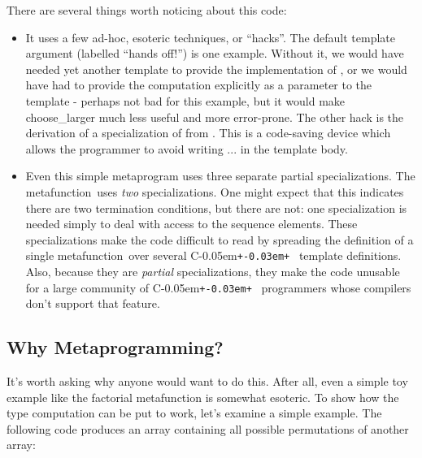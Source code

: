 \documentclass{netobjectdays}
\newcommand{\Cpp}{C\kern-0.05em\texttt{+\kern-0.03em+}%
}
\newcommand{\mfn}{meta\-function}
\begin{document}
There are several things worth noticing about this code:
\begin{itemize}

\item It uses a few ad-hoc, esoteric techniques, or ``hacks''. The
  default template argument  (labelled ``hands off!'')
  is one example. Without it, we would have needed yet another
  template to provide the implementation of ,
  or we would have had to provide the computation explicitly as a
  parameter to the template - perhaps not bad for this example, but it
  would make choose\_\-larger much less useful and more
  error-prone. The other hack is the derivation of a specialization of
   from . This is a code-saving
  device which allows the programmer to avoid writing ... in the template body.

\item Even this simple metaprogram uses three separate partial
  specializations. The  \mfn\ uses \emph{two}
  specializations. One might expect that this indicates there are two
  termination conditions, but there are not: one specialization is
  needed simply to deal with access to the sequence elements. These
  specializations make the code difficult to read by spreading the
  definition of a single \mfn\ over several \Cpp\ template
  definitions. Also, because they are \emph{partial} specializations,
  they make the code unusable for a large community of \Cpp\
  programmers whose compilers don't support that feature.
\end{itemize}

\subsection{Why Metaprogramming?}


It's worth asking why anyone would want to do this. After all, even a
simple toy example like the factorial metafunction is somewhat
esoteric. To show how the type computation can be put to work, let's
examine a simple example. The following code produces an array
containing all possible permutations of another array:
\end{document}
